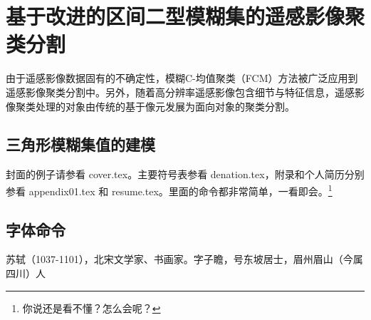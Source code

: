 
\chapter{基于改进的区间二型模糊集的遥感影像聚类分割}
\label{cha:chap03}

由于遥感影像数据固有的不确定性，模糊C-均值聚类（FCM）方法被广泛应用到遥感影像聚类分割中。另外，随着高分辨率遥感影像包含细节与特征信息，遥感影像聚类处理的对象由传统的基于像元发展为面向对象的聚类分割。

\section{三角形模糊集值的建模}
封面的例子请参看 cover.tex。主要符号表参看 denation.tex，附录和个人简历分别参看 appendix01.tex
和 resume.tex。里面的命令都非常简单，一看即会。\footnote{你说还是看不懂？怎么会呢？}

\section{字体命令}
\label{sec:first}

苏轼（1037-1101），北宋文学家、书画家。字子瞻，号东坡居士，眉州眉山（今属四川）人

